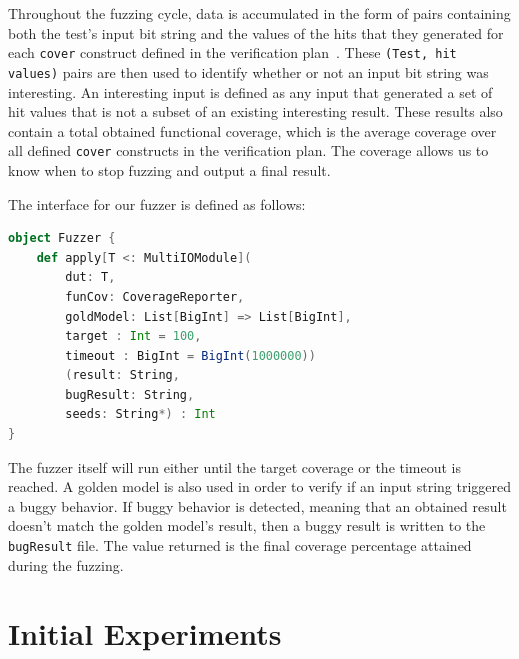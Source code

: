 \documentclass[conference]{IEEEtran}
\newcommand{\martin}[1]{{\color{blue} Martin: #1}}
\begin{document}
Throughout the fuzzing cycle, data is accumulated in the form of pairs containing both the test's input bit string and the values of the hits that they generated for each \texttt{cover} construct defined in the verification plan~\cite{dobis2021opensource}.
These \texttt{(Test, hit values)} pairs are then used to identify whether or not an input bit string was interesting.
An interesting input is defined as any input that generated a set of hit values that is not a subset of an existing interesting result.
These results also contain a total obtained functional coverage, which is the average coverage over all defined \texttt{cover} constructs in the verification plan.
The coverage allows us to know when to stop fuzzing and output a final result.


The interface for our fuzzer is defined as follows:
\begin{lstlisting}[captionpos=b,caption={Interface for the ChiselVerify fuzzer. It takes as parameter a \texttt{dut}, \texttt{chiselverify.coverage.CoverageReporter}, which is the verification plan used to define the functional coverage that will drive the fuzzing, and a golden model, which is used to find buggy results. It also takes in a target coverage percentage between 0 and 100, which defaults to 100, and a timeout which is set by default to 1'000'000. The second set of parameters are a result output file name, where all of the interesting tests and their resulting hit values will be written, a bug output file name, as well as a variable number of file paths, which will be used as seeds for the mutation engine. },label={lst:dutexample},language=scala]
object Fuzzer {
    def apply[T <: MultiIOModule](
        dut: T, 
        funCov: CoverageReporter, 
        goldModel: List[BigInt] => List[BigInt],
        target : Int = 100,
        timeout : BigInt = BigInt(1000000))
        (result: String,
        bugResult: String,
        seeds: String*) : Int
}
\end{lstlisting}
The fuzzer itself will run either until the target coverage or the timeout is reached. 
A golden model is also used in order to verify if an input string triggered a buggy behavior.
If buggy behavior is detected, meaning that an obtained result doesn't match the golden model's result, then a buggy result is written to the \texttt{bugResult} file.
The value returned is the final coverage percentage attained during the fuzzing.

\section{Initial Experiments}
\label{sec:eval}
%
\end{document}
